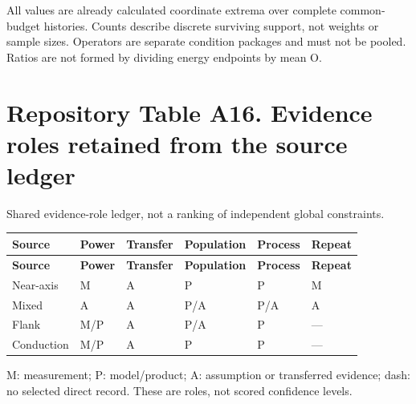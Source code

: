 \documentclass[11pt,a4paper]{article}
\begin{document}
All values are already calculated coordinate extrema over complete common-budget histories. Counts describe discrete surviving support, not weights or sample sizes. Operators are separate condition packages and must not be pooled. Ratios are not formed by dividing energy endpoints by mean O.\par
\clearpage

\section*{Repository Table A16. Evidence roles retained from the source ledger}
Shared evidence-role ledger, not a ranking of independent global constraints.\par
{\fontsize{8.3}{10.1}\selectfont\begin{longtable}{>{\raggedright\arraybackslash}p{26.217mm}>{\raggedright\arraybackslash}p{26.217mm}>{\raggedright\arraybackslash}p{26.217mm}>{\raggedright\arraybackslash}p{26.217mm}>{\raggedright\arraybackslash}p{26.217mm}>{\raggedright\arraybackslash}p{26.217mm}}\toprule
\textbf{Source} & \textbf{Power} & \textbf{Transfer} & \textbf{Population} & \textbf{Process} & \textbf{Repeat}\\\midrule\endfirsthead
\textbf{Source} & \textbf{Power} & \textbf{Transfer} & \textbf{Population} & \textbf{Process} & \textbf{Repeat}\\\midrule\endhead
\bottomrule\endfoot
Near-axis & M & A & P & P & M\\
Mixed & A & A & P/\allowbreak{}A & P/\allowbreak{}A & A\\
Flank & M/\allowbreak{}P & A & P/\allowbreak{}A & P & ---\\
Conduction & M/\allowbreak{}P & A & P & P & ---\\
\end{longtable}}
M: measurement; P: model/\allowbreak{}product; A: assumption or transferred evidence; dash: no selected direct record. These are roles, not scored confidence levels.\par
\clearpage
\end{document}
